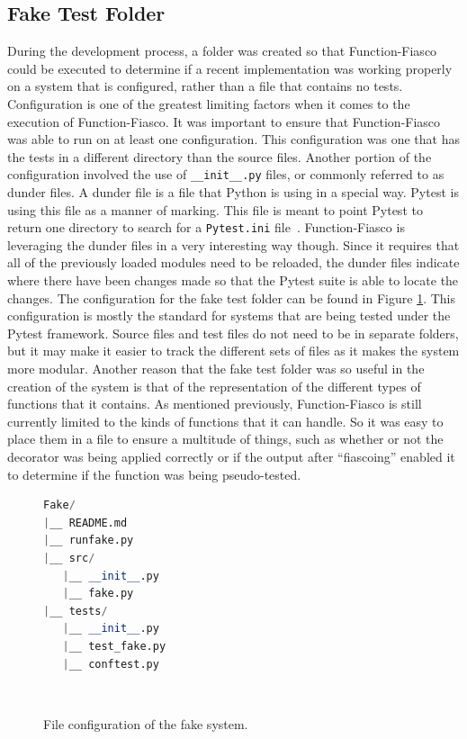 \subsection{Fake Test Folder}
During the development process, a folder was created so that Function-Fiasco could be executed to determine if a recent implementation was working properly on a system that is configured, rather than a file that contains no tests. Configuration is one of the greatest limiting factors when it comes to the execution of Function-Fiasco. It was important to ensure that Function-Fiasco was able to run on at least one configuration. This configuration was one that has the tests in a different directory than the source files. Another portion of the configuration involved the use of \texttt{\_\_init\_\_.py} files, or commonly referred to as dunder files. A dunder file is a file that Python is using in a special way. Pytest is using this file as a manner of marking. This file is meant to point Pytest to return one directory to search for a \texttt{Pytest.ini} file~\cite{okken_2018}. Function-Fiasco is leveraging the dunder files in a very interesting way though. Since it requires that all of the previously loaded modules need to be reloaded, the dunder files indicate where there have been changes made so that the Pytest suite is able to locate the changes. The configuration for the fake test folder can be found in Figure \ref{fakeConf}. This configuration is mostly the standard for systems that are being tested under the Pytest framework. Source files and test files do not need to be in separate folders, but it may make it easier to track the different sets of files as it makes the system more modular. Another reason that the fake test folder was so useful in the creation of the system is that of the representation of the different types of functions that it contains. As mentioned previously, Function-Fiasco is still currently limited to the kinds of functions that it can handle. So it was easy to place them in a file to ensure a multitude of things, such as whether or not the decorator was being applied correctly or if the output after ``fiascoing'' enabled it to determine if the function was being pseudo-tested.


\begin{figure}[t!]
\begin{lstlisting}[language = Python, frame = single]
Fake/
|__ README.md
|__ runfake.py
|__ src/
   |__ __init__.py
   |__ fake.py
|__ tests/
   |__ __init__.py
   |__ test_fake.py
   |__ conftest.py
\end{lstlisting}
\caption{File configuration of the fake system.}~\label{fakeConf}
\end{figure}

